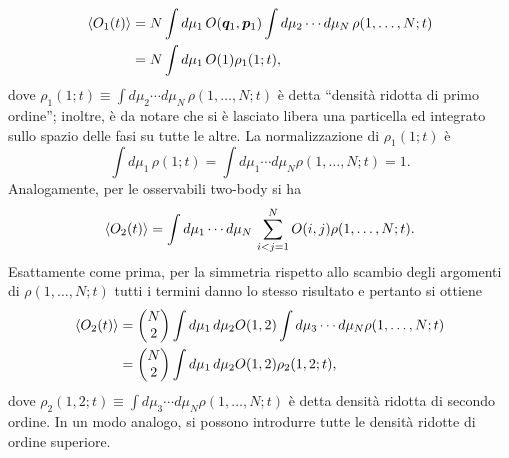 \begin{equation}
    \begin{split}
        \langle O_1(t) \rangle &= N\int d\mu_1\,O(\bm{q}_1,\bm{p}_1)\int d\mu_2\cdots d\mu_N\,\rho(1,\dots,N;t) \\ 
        &= N\int d\mu_1\,O(1)\rho_1(1;t),
    \end{split}
\end{equation}
dove $\rho_1(1;t) \equiv \int d\mu_2\cdots d\mu_N\,\rho(1,\dots,N;t)$ è detta ``densità ridotta di primo ordine''; inoltre, è da notare che si è lasciato libera una particella ed integrato sullo spazio delle fasi su tutte le altre. La normalizzazione di $\rho_1(1;t)$ è
\begin{equation}
    \int d\mu_1\,\rho(1;t) = \int d\mu_1\cdots d\mu_N\rho(1,\dots,N;t) = 1.
\end{equation}
Analogamente, per le osservabili two-body si ha 
\begin{equation}
    \langle O_2(t) \rangle = \int d\mu_1\cdots d\mu_N\,\sum_{i<j=1}^NO(i,j)\rho(1,\dots,N;t).
\end{equation}
Esattamente come prima, per la simmetria rispetto allo scambio degli argomenti di $\rho(1,\dots,N;t)$ tutti i termini danno lo stesso risultato e pertanto si ottiene
\begin{equation}
    \begin{split}
        \langle O_2(t) \rangle &= 
    \begin{pmatrix}
        N \\
        2
    \end{pmatrix}
    \int d\mu_1\,d\mu_2 O(1,2)\int d\mu_3\cdots d\mu_N\rho(1,\dots,N;t) \\
    &= \begin{pmatrix}
        N \\
        2
    \end{pmatrix}
    \int d\mu_1\,d\mu_2 O(1,2)\rho_2(1,2;t),
    \end{split}
\end{equation}
dove $\rho_2(1,2;t) \equiv \int d\mu_3\cdots d\mu_N\rho(1,\dots,N;t)$ è detta densità ridotta di secondo ordine. In un modo analogo, si possono introdurre tutte le densità ridotte di ordine superiore. 

